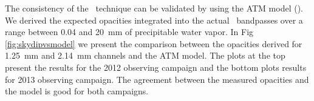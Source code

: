 The consistency of the \Skydip\ technique can be validated by using the ATM
model (\cite{2001IEEE....49.1683C}). We derived the expected opacities integrated into the actual \NIKA\
bandpasses over a range between 0.04 and 20~mm of precipitable water vapor.
In Fig \ref{fig:skydipvsmodel} we present the comparison between the opacities
derived for 1.25~mm and 2.14~mm channels and the ATM model. The plots at the top present the results for the 2012
observing campaign and the bottom plots results for 2013 observing campaign. The
agreement between the measured opacities and the model is good for both
campaigns. 



%



